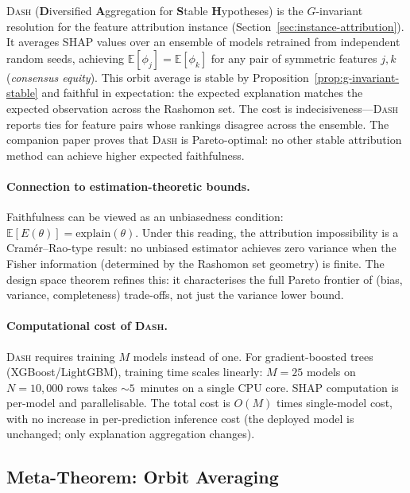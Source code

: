\documentclass[11pt,a4paper]{article}
\newcommand{\E}{\mathbb{E}}
\newcommand{\DASH}{\textsc{Dash}}
\begin{document}
\DASH{} (\textbf{D}iversified \textbf{A}ggregation for \textbf{S}table \textbf{H}ypotheses)
is the $G$-invariant resolution for the feature attribution instance
(Section~\ref{sec:instance-attribution}).  It averages SHAP values over an
ensemble of models retrained from independent random seeds, achieving
$\E[\phi_j] = \E[\phi_k]$ for any pair of symmetric features $j, k$
(\emph{consensus equity}).  This orbit average is stable by
Proposition~\ref{prop:g-invariant-stable} and faithful in expectation: the
expected explanation matches the expected observation across the Rashomon set.
The cost is indecisiveness---\DASH{} reports ties for feature pairs whose
rankings disagree across the ensemble.  The companion paper proves that
\DASH{} is Pareto-optimal: no other stable attribution method can achieve
higher expected faithfulness.

\paragraph{Connection to estimation-theoretic bounds.}
Faithfulness can be viewed as an unbiasedness condition: $\E[E(\theta)] = \text{explain}(\theta)$. Under this reading, the attribution impossibility is a Cram\'er--Rao-type result: no unbiased estimator achieves zero variance when the Fisher information (determined by the Rashomon set geometry) is finite. The design space theorem refines this: it characterises the full Pareto frontier of (bias, variance, completeness) trade-offs, not just the variance lower bound.

\paragraph{Computational cost of \DASH{}.}
\DASH{} requires training $M$ models instead of one. For gradient-boosted trees (XGBoost/LightGBM), training time scales linearly: $M = 25$ models on $N = 10{,}000$ rows takes ${\sim}5$~minutes on a single CPU core. SHAP computation is per-model and parallelisable. The total cost is $O(M)$ times single-model cost, with no increase in per-prediction inference cost (the deployed model is unchanged; only explanation aggregation changes).

\subsection{Meta-Theorem: Orbit Averaging}
\label{sec:meta-theorem}
\end{document}
